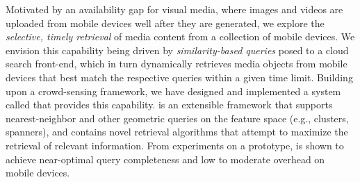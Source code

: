 
%

Motivated by an availability gap for visual media, where images and
videos are uploaded from mobile devices well after they are generated,
we explore the \emph{selective,
  timely retrieval} of media content from a collection of mobile
devices.
%
We envision this capability being driven by \emph{similarity-based
  queries} posed to a cloud search front-end, which in turn
dynamically retrieves media objects from mobile devices that best
match the respective queries within a given time limit.
%
Building upon a crowd-sensing framework, we have designed and
implemented a system called \mscope that provides this capability.
%
\mscope is an extensible framework that supports nearest-neighbor
and other geometric queries on the feature space (e.g., clusters,
spanners), and contains novel retrieval algorithms that attempt to
maximize the retrieval of relevant information.
%
From experiments on a prototype, \mscope is shown to achieve
near-optimal query completeness and low to moderate overhead on mobile
devices.


%
